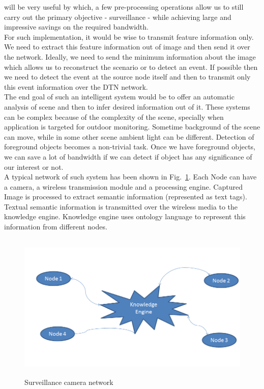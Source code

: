 will be very useful by which, a few pre-processing operations allow us to
still carry out the primary objective - surveillance - while achieving
large and impressive savings on the required bandwidth.\\
\indent  For such implementation, it would be wise to transmit feature
information only. We need to extract this feature information out of
image and then send it over the network.  Ideally, we need to send the
minimum information about the image which allows us to reconstruct the
scenario or to detect an event. If possible then we need to detect the
event at the source node itself and then to transmit only this event
information over the DTN network.\\
\indent The end goal of such an intelligent system would be to offer an
automatic analysis of scene and then to infer desired information out of
it. These systems can be complex because of the complexity of the scene,
specially when application is targeted for outdoor monitoring.  Sometime
background of the scene can move, while in some other scene ambient
light can be different. Detection of foreground objects becomes a
non-trivial task.  Once we have foreground objects, we can save a lot of
bandwidth if we can detect if object has any significance of our
interest or not.\\
\indent A typical network of such system has been shown in
Fig.~\ref{KE}. Each Node can have a camera, a wireless transmission
module and a processing engine. Captured Image is processed to extract
semantic information (represented as text tags). Textual semantic
information is transmitted over the wireless media to the knowledge
engine. Knowledge engine uses ontology language to represent this
information from different nodes.
\begin{figure}[!b]
\centering
\includegraphics[height=200pt]{Figures/KE}
\caption{Surveillance camera network}
\label{KE}
\end{figure}

